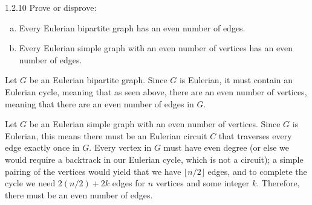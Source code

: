 \documentclass[9pt]{extarticle}
\begin{document}
\begin{problem}{1.2.10}
  Prove or disprove:
  \begin{enumerate}[(a)]
      \item Every Eulerian bipartite graph has an even number of edges.
      \item Every Eulerian simple graph with an even number of vertices has an even number of edges.
    \end{enumerate}
    \tcblower
  \begin{tcolorbox}[colback = white, title = (a)]
    Let $G$ be an Eulerian bipartite graph. Since $G$ is Eulerian, it must contain an Eulerian cycle, meaning that as seen above, there are an even number of vertices, meaning that there are an even number of edges in $G$. 
  \end{tcolorbox}

  \begin{tcolorbox}[colback = white, title = (b)]
    Let $G$ be an Eulerian simple graph with an even number of vertices. Since $G$ is Eulerian, this means there must be an Eulerian circuit $C$ that traverses every edge exactly once in $G$. Every vertex in $G$ must have even degree (or else we would require a backtrack in our Eulerian cycle, which is not a circuit); a simple pairing of the vertices would yield that we have $\lfloor n/2\rfloor $ edges, and to complete the cycle we need $2(n/2) + 2k$ edges for $n$ vertices and some integer $k$. Therefore, there must be an even number of edges.
  \end{tcolorbox}
\end{problem}
\end{document}
